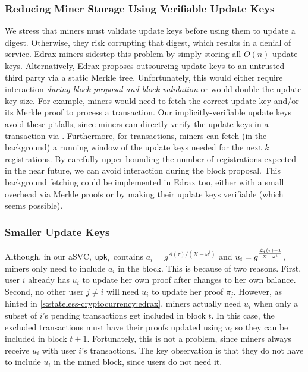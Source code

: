 \subsubsection{Reducing Miner Storage Using Verifiable Update Keys}
\label{s:stateless-cryptocurrency:dos-update-key}

We stress that miners must validate update keys before using them to update a digest.
Otherwise, they risk corrupting that digest, which results in a denial of service.
Edrax miners sidestep this problem by simply storing all $O(n)$ update keys.
Alternatively, Edrax proposes outsourcing update keys to an untrusted third party via a static Merkle tree.
Unfortunately, this would either require interaction \textit{during block proposal and block validation} or would double the update key size.
\ifNotCameraReady
For example, miners would need to fetch the correct update key and/or its Merkle proof to process a \spendtxn transaction.
\fi
Our implicitly-verifiable update keys avoid these pitfalls, since miners can directly verify the update keys in a \spendtxn transaction via \vcverifyupk.
Furthermore, for \inittxn transactions, miners can fetch (in the background) a running window of the update keys needed for the next $k$ registrations.
By carefully upper-bounding the number of registrations expected in the near future, we can avoid interaction during the block proposal.
This background fetching could be implemented in Edrax too, either with a small overhead via Merkle proofs or by making their update keys verifiable (which seems possible).

\subsubsection{Smaller Update Keys}
\label{s:stateless-cryptocurrency:smaller-update-keys}
Although, in our aSVC, $\mathsf{upk}_i$ contains $a_i=g^{A(\tau)/(X-\omega^i)}$ and $u_i=g^{\frac{\mathcal{L}_i(\tau)-1}{X-\omega^i}}$, miners only need to include $a_i$ in the block.
This is because of two reasons.
First, user $i$ already has $u_i$ to update her own proof after changes to her own balance.
Second, no other user $j\ne i$ will need $u_i$ to update her proof $\pi_j$.
However, as hinted in \cref{s:stateless-cryptocurrency:edrax}, miners actually need $u_i$ when only a subset of $i$'s pending transactions get included in block $t$.
In this case, the excluded transactions must have their proofs updated using $u_i$ so they can be included in block $t+1$.
Fortunately, this is not a problem, since miners always receive $u_i$ with user $i$'s transactions.
The key observation is that they do not have to include $u_i$ in the mined block, since users do not need it.

